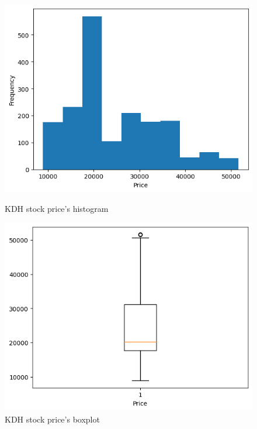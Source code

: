 \documentclass[conference]{IEEEtran}
\begin{document}
\begin{figure}[H]
    \centering
    \begin{minipage}{0.23\textwidth}
    \centering
    \includegraphics[width=1\textwidth]{figures/descriptive_stat/KDH_Histogram.png}
    \caption{KDH stock price's histogram}
    \label{fig_KDH_histogram}
    \end{minipage}
    \hfill
    \begin{minipage}{0.23\textwidth}
    \centering
    \includegraphics[width=1\textwidth]{figures/descriptive_stat/KDH_BoxPlot.png}
    \caption{KDH stock price's boxplot}
    \label{fig_KDH_bp}
    \end{minipage}
\end{figure}
\end{document}
